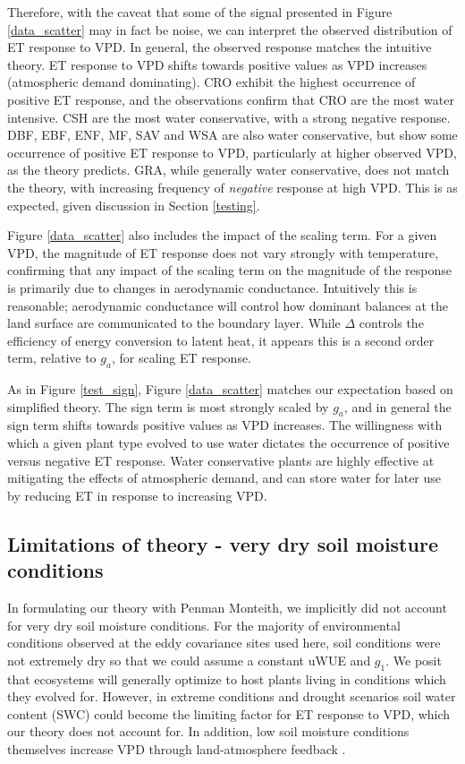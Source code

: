\documentclass[draft,linenumbers]{agujournal}
\begin{document}
Therefore, with the caveat that some of the signal presented in Figure \ref{data_scatter} may in fact be noise, we can interpret the observed distribution of ET response to VPD. In general, the observed response matches the intuitive theory. ET response to VPD shifts towards positive values as VPD increases (atmospheric demand dominating). CRO exhibit the highest occurrence of positive ET response, and the observations confirm that CRO are the most water intensive. CSH are the most water conservative, with a strong negative response. DBF, EBF, ENF, MF, SAV and WSA are also water conservative, but show some occurrence of positive ET response to VPD, particularly at higher observed VPD, as the theory predicts. GRA, while generally water conservative, does not match the theory, with increasing frequency of \textit{negative} response at high VPD. This is as expected, given discussion in Section \ref{testing}. 

Figure \ref{data_scatter} also includes the impact of the scaling term. For a given VPD, the magnitude of ET response does not vary strongly with temperature, confirming that any impact of the scaling term on the magnitude of the response is primarily due to changes in aerodynamic conductance. Intuitively this is reasonable; aerodynamic conductance will control how dominant balances at the land surface are communicated to the boundary layer. While $\Delta$ controls the efficiency of energy conversion to latent heat, it appears this is a second order term, relative to $g_a$, for scaling ET response. 

As in Figure \ref{test_sign}, Figure \ref{data_scatter} matches our expectation based on simplified theory. The sign term is most strongly scaled by $g_a$, and in general the sign term shifts towards positive values as VPD increases. The willingness with which a given plant type evolved to use water dictates the occurrence of positive versus negative ET response. Water conservative plants are highly effective at mitigating the effects of atmospheric demand, and can store water for later use by reducing ET in response to increasing VPD.

\subsection{Limitations of theory - very dry soil moisture conditions}
In formulating our theory with Penman Monteith, we implicitly did not account for very dry soil moisture conditions. For the majority of environmental conditions  observed at the eddy covariance sites used here, soil conditions were not extremely dry so that we could assume a constant uWUE and $g_1$. We posit that ecosystems will generally optimize to host plants living in conditions which they evolved for. However, in extreme conditions and drought scenarios soil water content (SWC) could become the limiting factor for ET response to VPD, which our theory does not account for. In addition, low soil moisture conditions themselves increase VPD through land-atmosphere feedback \citep[][]{Bouchet_1963, Morton_1965, Brutsaert_1999, Ozdogan_2006, Salvucci_2013, Gentine_2016, Berg_2016}.
\end{document}

